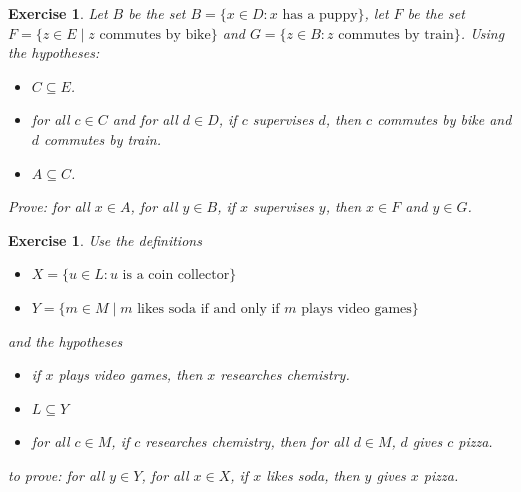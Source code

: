 \documentclass{book}
\newcounter{ekcounter}%
\theoremstyle{ekimcustom}
\newtheorem{exercise}[ekcounter]{Exercise}
\begin{document}
\begin{exercise}
Let $B$ be the set $B = \{x \in D : x\text{ has a puppy}\}$, let $F$ be the set $F = \{z \in E \mid z \text{ commutes by bike}\}$ and $G=\{z \in B : z \text{ commutes by train}\}$.  Using the hypotheses:
\begin{itemize}
\item $C \subseteq E$.
\item for all $c \in C$ and for all $d \in D$, if $c$ supervises $d$, then $c$ commutes by bike and $d$ commutes by train.
\item $A \subseteq C$.
\end{itemize}
Prove: for all $x \in A$, for all $y \in B$, if $x$ supervises $y$, then $x \in F$ and $y \in G$.
\end{exercise}

\begin{exercise}
Use the definitions
\begin{itemize}
\item $X = \{u \in L: u \text{ is a coin collector}\}$
\item $Y = \{m \in M \mid m \text{ likes soda if and only if } m \text{ plays video games}\}$
\end{itemize}
and the hypotheses
\begin{itemize}
\item if $x$ plays video games, then $x$ researches chemistry.
\item $L \subseteq Y$
\item for all $c \in M$, if $c$ researches chemistry, then for all $d \in M$,\,\,$d$ gives $c$ pizza.
\end{itemize}
to prove: for all $y \in Y$, for all $x \in X$, if $x$ likes soda, then $y$ gives $x$ pizza.
\end{exercise}
\end{document}
